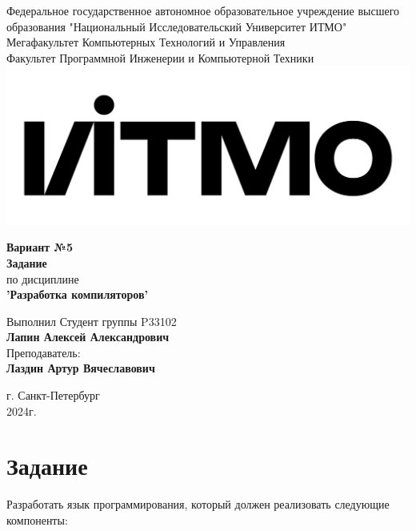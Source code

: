 \documentclass[12pt,onecolumn]{article}
\begin{document}
\setcounter{tocdepth}{4}
\begin{center}
    Федеральное государственное автономное образовательное учреждение высшего образования "Национальный Исследовательский Университет ИТМО"\\
    Мегафакультет Компьютерных Технологий и Управления\\
    Факультет Программной Инженерии и Компьютерной Техники \\
    \includegraphics[scale=0.3]{image/itmo.jpg} %
\end{center}
\vspace{1cm}


\begin{center}
    \large \textbf{Вариант №5}\\
    \textbf{Задание}\\
    по дисциплине\\
    \textbf{'Разработка компиляторов'}
\end{center}

\vspace{2cm}

\begin{flushright}
    Выполнил Студент  группы P33102\\
    \textbf{Лапин Алексей Александрович}\\
    Преподаватель: \\
    \textbf{Лаздин Артур Вячеславович}\\
\end{flushright}

\vspace{9cm}
\begin{center}
    г. Санкт-Петербург\\
    2024г.
\end{center}
\pagestyle{empty}


\section*{Задание}
Разработать язык программирования, который должен реализовать следующие компоненты:
\end{document}
